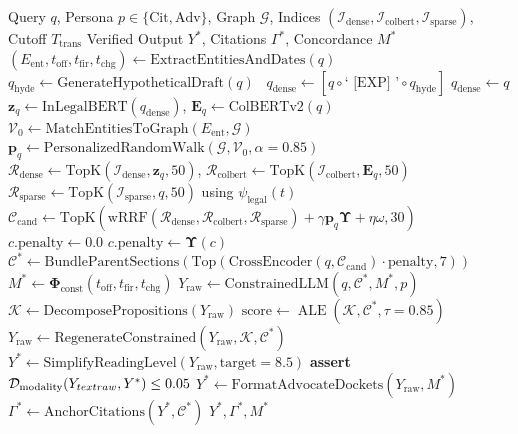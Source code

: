\documentclass[conference]{IEEEtran}
\begin{document}
\begin{algorithm}[!t]
\caption{Nirnay-X Grounded Verification Pipeline (PAVE)}
\label{alg:master}
\begin{algorithmic}[1]
\Require Query $q$, Persona $p \in \{\text{Cit}, \text{Adv}\}$, Graph $\mathcal{G}$, Indices $(\mathcal{I}_{\text{dense}}, \mathcal{I}_{\text{colbert}}, \mathcal{I}_{\text{sparse}})$, Cutoff $T_{\text{trans}}$
\Ensure Verified Output $Y^*$, Citations $\Gamma^*$, Concordance $M^*$
\State $(E_{\text{ent}}, t_{\text{off}}, t_{\text{fir}}, t_{\text{chg}}) \gets \text{ExtractEntitiesAndDates}(q)$
    \State $q_{\text{hyde}} \gets \text{GenerateHypotheticalDraft}(q)$~\cite{gao2023precise}
    \State $q_{\text{dense}} \gets [q \circ \text{` [EXP] '} \circ q_{\text{hyde}}]$
\Else
    \State $q_{\text{dense}} \gets q$
\EndIf
\State $\mathbf{z}_q \gets \text{InLegalBERT}(q_{\text{dense}})$, $\mathbf{E}_q \gets \text{ColBERTv2}(q)$
\State $\mathcal{V}_0 \gets \text{MatchEntitiesToGraph}(E_{\text{ent}}, \mathcal{G})$
\State $\mathbf{p}_q \gets \text{PersonalizedRandomWalk}(\mathcal{G}, \mathcal{V}_0, \alpha=0.85)$
\State $\mathcal{R}_{\text{dense}} \gets \text{TopK}(\mathcal{I}_{\text{dense}}, \mathbf{z}_q, 50)$, $\mathcal{R}_{\text{colbert}} \gets \text{TopK}(\mathcal{I}_{\text{colbert}}, \mathbf{E}_q, 50)$
\State $\mathcal{R}_{\text{sparse}} \gets \text{TopK}(\mathcal{I}_{\text{sparse}}, q, 50)$ using $\psi_{\text{legal}}(t)$
\State $\mathcal{C}_{\text{cand}} \gets \text{TopK}(\text{wRRF}(\mathcal{R}_{\text{dense}}, \mathcal{R}_{\text{colbert}}, \mathcal{R}_{\text{sparse}}) + \gamma \mathbf{p}_q \mathbf{\Upsilon} + \eta \omega, 30)$
        \State $c.\text{penalty} \gets 0.0$
    \Else
        \State $c.\text{penalty} \gets \mathbf{\Upsilon}(c)$
    \EndIf
\EndFor
\State $\mathcal{C}^* \gets \text{BundleParentSections}(\text{Top}(\text{CrossEncoder}(q, \mathcal{C}_{\text{cand}}) \cdot \text{penalty}, 7))$
\State $M^* \gets \mathbf{\Phi}_{\text{const}}(t_{\text{off}}, t_{\text{fir}}, t_{\text{chg}})$
\State $Y_{\text{raw}} \gets \text{ConstrainedLLM}(q, \mathcal{C}^*, M^*, p)$
\State $\mathcal{K} \gets \text{DecomposePropositions}(Y_{\text{raw}})$
\State $\text{score} \gets \operatorname{ALE}(\mathcal{K}, \mathcal{C}^*, \tau=0.85)$
    \State $Y_{\text{raw}} \gets \text{RegenerateConstrained}(Y_{\text{raw}}, \mathcal{K}, \mathcal{C}^*)$
\EndIf
{}
    \State $Y^* \gets \text{SimplifyReadingLevel}(Y_{\text{raw}}, \text{target}=8.5)$
    \State \textbf{assert} $\mathcal{D}_{\text{modality}}(Y_{\\text{raw}}, Y^*) \le 0.05$
\Else
    \State $Y^* \gets \text{FormatAdvocateDockets}(Y_{\text{raw}}, M^*)$
\EndIf
\State $\Gamma^* \gets \text{AnchorCitations}(Y^*, \mathcal{C}^*)$
\State \Return $Y^*, \Gamma^*, M^*$
\end{algorithmic}
\end{algorithm}
\end{document}
